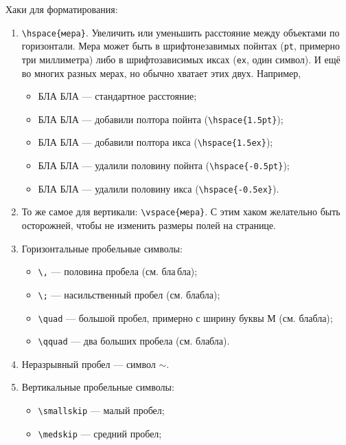\documentclass[14pt, russian]{scrartcl}
\begin{document}
Хаки для форматирования:
\begin{enumerate}
\item \texttt{\textbackslash hspace\{мера\}}. Увеличить или уменьшить расстояние между объектами по горизонтали. Мера может быть в шрифтонезавимых пойнтах (\texttt{pt}, примерно три миллиметра) либо в шрифтозависимых иксах (\texttt{ex}, один символ). И ещё во многих разных мерах, но обычно хватает этих двух. Например, 
\begin{itemize}
\item БЛА БЛА --- стандартное расстояние; 
\item БЛА\hspace{1.5pt} БЛА --- добавили полтора пойнта (\texttt{\textbackslash hspace\{1.5pt\}});
\item БЛА\hspace{1.5ex} БЛА --- добавили полтора икса (\texttt{\textbackslash hspace\{1.5ex\}});
\item БЛА\hspace{-0.5pt} БЛА --- удалили половину пойнта (\texttt{\textbackslash hspace\{-0.5pt\}});
\item БЛА\hspace{-0.5ex} БЛА --- удалили половину икса (\texttt{\textbackslash hspace\{-0.5ex\}}).
\end{itemize}
\item То же самое для вертикали: \texttt{\textbackslash vspace\{мера\}}. С этим хаком желательно быть осторожней, чтобы не изменить размеры полей на странице.
\item Горизонтальные пробельные символы:
\begin{itemize}
\item \texttt{\textbackslash ,} --- половина пробела (см. бла\,бла);
\item \texttt{\textbackslash ;} --- насильственный пробел (см. бла\;бла);
\item \texttt{\textbackslash quad} --- большой пробел, примерно с ширину буквы М (см. бла\quad бла);
\item \texttt{\textbackslash qquad} --- два больших пробела  (см. бла\qquad бла).
\end{itemize}
\item Неразрывный пробел --- символ $\sim$.
\item Вертикальные пробельные символы:
\begin{itemize}
\item \texttt{\textbackslash smallskip} --- малый пробел;
\item \texttt{\textbackslash medskip} --- средний пробел;

\end{itemize}
\end{enumerate}
\end{document}

